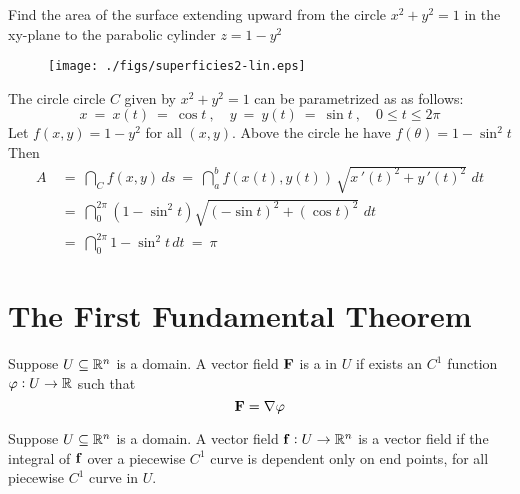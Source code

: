\begin{exa}
Find the area of the surface extending upward from the circle $x^2 + y^2 = 1$
in the xy-plane to the parabolic cylinder $z = 1 - y^2$ 
\end{exa}

\begin{figure}[h]
 \centering
 \texttt{[image: ./figs/superficies2-lin.eps]}
\end{figure}

\begin{solu} The circle 
 circle $C$ given by $x^2 + y^2 = 1$ can be parametrized as 
 as follows:
 \begin{displaymath}
  x ~=~ x(t) ~=~  \cos t ~,\quad y ~=~ y(t) ~=~  \sin t~,\quad 0 \le t \le 2\pi
 \end{displaymath}
 Let $f(x,y) =  1 - y^2$ for all $(x,y)$. 
 Above the circle he have 
 $f(\theta) =  1 - \sin^2 t$ 
 Then
 \begin{align*}
  A ~&=~ \dint_C f(x,y)\,ds ~=~ \dint_a^b f(x(t),y(t)) \,\sqrt{x\,'(t)^2 + y\,'(t)^2}\,\,dt\\
   &=~ \dint_0^{2\pi} (1 - \sin^2 t)  \sqrt{(- \sin t)^2 + ( \cos t)^2}\,\,dt\\
   &=~ \dint_0^{2\pi}  1 - \sin^2 t \,dt ~=~ \pi
 \end{align*}
\end{solu}


 \section{The First Fundamental Theorem}
 
 \begin{df}
 Suppose $U \subseteq \mathbb{R}^n$ is a domain.   A vector field  $\mathbf{ F}$ is a  in $U$ if exists  an $C^1$ function
$\varphi:U \to \mathbb{R}$  such that 
\[\mathbf{ F}=\nabla \varphi \]
 \end{df}

 \begin{df}
  Suppose $U \subseteq \mathbb{R}^n$ is a domain. 
 A vector field  $\mathbf{ f}:U \to \mathbb{R}^n$ is a  vector field if the integral of $\mathbf{ f}$ over a piecewise $C^1$ curve is dependent only on end points, for all piecewise $C^1$ curve in $U$.
 
 \end{df}

 
 
